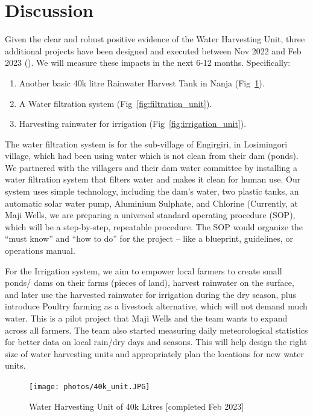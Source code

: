 \documentclass[10pt, twocolumn]{article}
\begin{document}
\section{Discussion}

Given the clear and robust positive evidence of the Water Harvesting Unit, three additional projects have been designed and executed between Nov 2022 and Feb 2023 (\autocite{Karimu}). We will measure these impacts in the next 6-12 months. Specifically:

\begin{enumerate}
    \item Another basic 40k litre Rainwater Harvest Tank in Nanja (Fig~\ref{fig:40k_unit}).
    \item A Water filtration system (Fig~\ref{fig:filtration_unit}).
    \item Harvesting rainwater for irrigation (Fig~\ref{fig:irrigation_unit}).
\end{enumerate}

The water filtration system is for the sub-village of Engirgiri, in Losimingori village, which had been using water which is not clean from their dam (ponds). We partnered with the villagers and their dam water committee by installing a water filtration system that filters water and makes it clean for human use. Our system uses simple technology, including the dam's water, two plastic tanks, an automatic solar water pump, Aluminium Sulphate, and Chlorine (Currently, at Maji Wells, we are preparing a universal standard operating procedure (SOP), which will be a step-by-step, repeatable procedure. The SOP would organize the “must know” and “how to do” for the project – like a blueprint, guidelines, or operations manual.

For the Irrigation system, we aim to empower local farmers to create small ponds/ dams on their farms (pieces of land), harvest rainwater on the surface, and later use the harvested rainwater for irrigation during the dry season, plus introduce Poultry farming as a livestock alternative, which will not demand much water. This is a pilot project that Maji Wells and the team wants to expand across all farmers. The team also started measuring daily meteorological statistics for better data on local rain/dry days and seasons. This will help design the right size of water harvesting units and appropriately plan the locations for new water units.

\begin{figure}
    \centering
    \texttt{[image: photos/40k\_unit.JPG]}
    \caption{Water Harvesting Unit of 40k Litres [completed Feb 2023]}
    \label{fig:40k_unit}
\end{figure}
\end{document}

